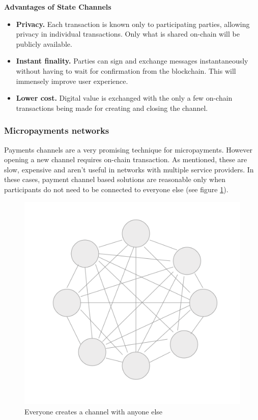 \documentclass[a4paper,12pt]{article}
\begin{document}
\textbf{\large {Advantages of State Channels}}
\begin{itemize}
    \item \textbf{Privacy.} Each transaction is known only to participating 
    parties, allowing privacy in individual transactions. Only what is shared 
    on-chain will be publicly available.
    \item \textbf{Instant finality.} Parties can sign and exchange messages 
    instantaneously without having to wait for confirmation from the blockchain. 
    This will immensely improve user experience.
    \item \textbf{Lower cost.} Digital value is exchanged with the only a few
    on-chain transactions being made for creating and closing the channel.
\end{itemize}

\subsubsection{Micropayments networks}

Payments channels are a very promising technique for micropayments. However opening 
a new channel requires on-chain transaction. As mentioned, these are slow, expensive 
and aren't useful in networks with multiple service providers. In these cases, 
payment channel based solutions are reasonable only when participants do not need to 
be connected to everyone else (see figure \ref{img:many-to-many}).

\begin{figure}[H]
    \centering
    \includegraphics[scale=0.5]{../img/many-to-many}
    \caption{Everyone creates a channel with anyone else}
    \label{img:many-to-many}
\end{figure}
\end{document}
